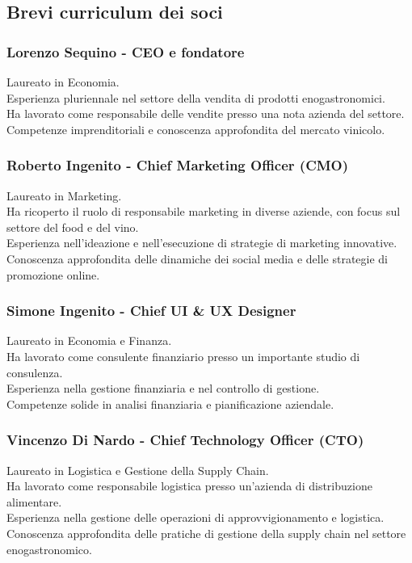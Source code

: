 \documentclass[12pt, a4paper]{article}
\begin{document}
\subsection{Brevi curriculum dei soci}
\subsubsection*{Lorenzo Sequino - CEO e fondatore}
Laureato in Economia.\\
Esperienza pluriennale nel settore della vendita di prodotti enogastronomici.\\
Ha lavorato come responsabile delle vendite presso una nota azienda del settore.\\
Competenze imprenditoriali e conoscenza approfondita del mercato vinicolo.

\subsubsection*{Roberto Ingenito - Chief Marketing Officer (CMO)}
Laureato in Marketing.\\
Ha ricoperto il ruolo di responsabile marketing in diverse aziende, con focus sul settore del food e del vino.\\
Esperienza nell'ideazione e nell'esecuzione di strategie di marketing innovative.\\
Conoscenza approfondita delle dinamiche dei social media e delle strategie di promozione online.

\subsubsection*{Simone Ingenito - Chief UI \& UX Designer}
Laureato in Economia e Finanza.\\
Ha lavorato come consulente finanziario presso un importante studio di consulenza.\\
Esperienza nella gestione finanziaria e nel controllo di gestione.\\
Competenze solide in analisi finanziaria e pianificazione aziendale.

\subsubsection*{Vincenzo Di Nardo - Chief Technology Officer (CTO)}
Laureato in Logistica e Gestione della Supply Chain.\\
Ha lavorato come responsabile logistica presso un'azienda di distribuzione alimentare.\\
Esperienza nella gestione delle operazioni di approvvigionamento e logistica.\\
Conoscenza approfondita delle pratiche di gestione della supply chain nel settore enogastronomico.
\end{document}
